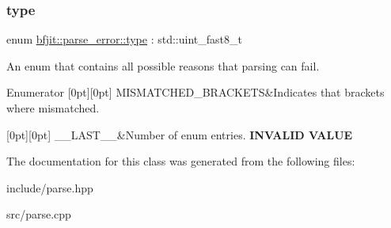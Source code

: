 \subsubsection{\texorpdfstring{type}{type}}
{\footnotesize\ttfamily enum \hyperlink{classbfjit_1_1parse__error_af750138d196890dcdc543c9fb1b7705b}{bfjit\+::parse\+\_\+error\+::type} \+: std\+::uint\+\_\+fast8\+\_\+t\hspace{0.3cm}{\ttfamily [strong]}}



An enum that contains all possible reasons that parsing can fail. 

\begin{DoxyEnumFields}{Enumerator}
[0pt][0pt]{}\hypertarget{classbfjit_1_1parse__error_af750138d196890dcdc543c9fb1b7705badb8aa960a3f467cff16772c10e9a4c07}{}\label{classbfjit_1_1parse__error_af750138d196890dcdc543c9fb1b7705badb8aa960a3f467cff16772c10e9a4c07} 
M\+I\+S\+M\+A\+T\+C\+H\+E\+D\+\_\+\+B\+R\+A\+C\+K\+E\+TS&Indicates that brackets where mismatched. \\
\hline

[0pt][0pt]{}\hypertarget{classbfjit_1_1parse__error_af750138d196890dcdc543c9fb1b7705ba62bd5a4afef994ba01e631cbf00f85be}{}\label{classbfjit_1_1parse__error_af750138d196890dcdc543c9fb1b7705ba62bd5a4afef994ba01e631cbf00f85be} 
\+\_\+\+\_\+\+L\+A\+S\+T\+\_\+\+\_\+&Number of enum entries. {\bfseries I\+N\+V\+A\+L\+ID V\+A\+L\+UE} \\
\hline

\end{DoxyEnumFields}


The documentation for this class was generated from the following files\+:\begin{DoxyCompactItemize}
\item 
include/parse.\+hpp\item 
src/parse.\+cpp\end{DoxyCompactItemize}
